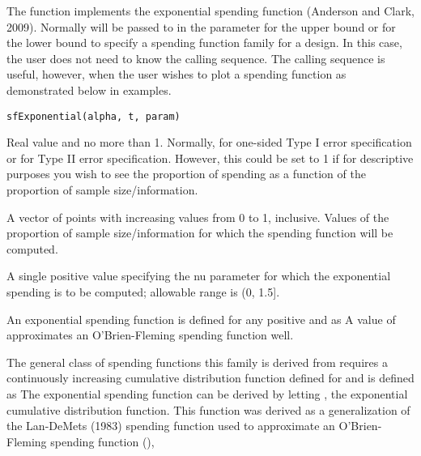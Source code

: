 \begin{Description}\relax
The function  implements the exponential spending function (Anderson and Clark, 2009).
Normally  will be passed to  in the parameter  for the upper bound or
 for the lower bound to specify a spending function family for a design.
In this case, the user does not need to know the calling sequence.
The calling sequence is useful, however, when the user wishes to plot a spending function as demonstrated below
in examples.
\end{Description}
\begin{Usage}
\begin{verbatim}
sfExponential(alpha, t, param)
\end{verbatim}
\end{Usage}
\begin{Arguments}
\begin{ldescription}
\item[\code{alpha}] Real value  and no more than 1. Normally, 
 for one-sided Type I error specification
or  for Type II error specification. However, this could be set to 1 if for descriptive purposes
you wish to see the proportion of spending as a function of the proportion of sample size/information.
\item[\code{t}] A vector of points with increasing values from 0 to 1, inclusive. Values of the proportion of 
sample size/information for which the spending function will be computed.
\item[\code{param}] A single positive value specifying the nu parameter for which the exponential spending is to be computed; allowable range is (0, 1.5].
\end{ldescription}
\end{Arguments}
\begin{Details}\relax
An  exponential spending function is defined for any positive  and  as
A value of  approximates an O'Brien-Fleming spending function well.

The general class of spending functions this family is derived from requires a continuously increasing 
cumulative distribution function defined for  and is defined as
The exponential spending function can be derived by letting , the exponential cumulative distribution function.
This function was derived as a generalization of the Lan-DeMets (1983) spending function used to approximate an
O'Brien-Fleming spending function (),
\end{Details}
